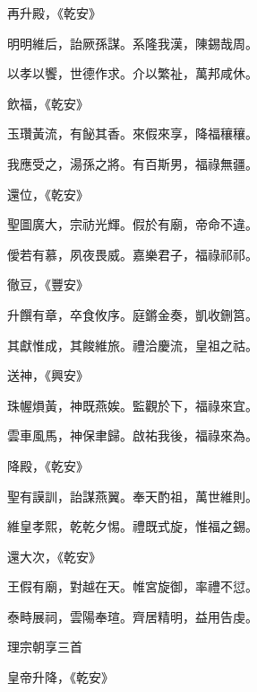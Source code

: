 \begin{pinyinscope}
 再升殿，《乾安》



 明明維后，詒厥孫謀。系隆我漢，陳錫哉周。



 以孝以饗，世德作求。介以繁祉，萬邦咸休。



 飲福，《乾安》



 玉瓚黃流，有飶其香。來假來享，降福穰穰。



 我應受之，湯孫之將。有百斯男，福祿無疆。



 還位，《乾安》



 聖圖廣大，宗祊光輝。假於有廟，帝命不違。



 僾若有慕，夙夜畏威。嘉樂君子，福祿祁祁。



 徹豆，《豐安》



 升饌有章，卒食攸序。庭鏘金奏，凱收鉶筥。



 其獻惟成，其餕維旅。禮洽慶流，皇祖之祜。



 送神，《興安》



 珠幄熉黃，神既燕娭。監觀於下，福祿來宜。



 雲車風馬，神保聿歸。啟祐我後，福祿來為。



 降殿，《乾安》



 聖有謨訓，詒謀燕翼。奉天酌祖，萬世維則。



 維皇孝熙，乾乾夕惕。禮既式旋，惟福之錫。



 還大次，《乾安》



 王假有廟，對越在天。帷宮旋御，率禮不愆。



 泰畤展祠，雲陽奉瑄。齊居精明，益用告虔。



 理宗朝享三首



 皇帝升降，《乾安》




\end{pinyinscope}
